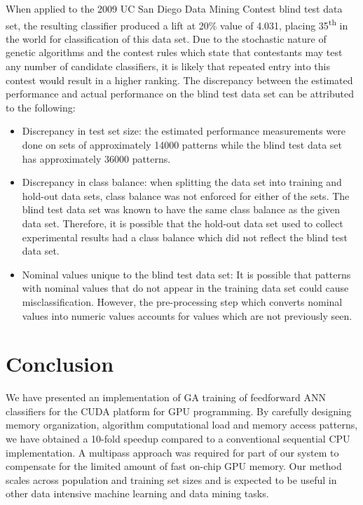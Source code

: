 \documentclass[11pt]{article}       %
\begin{document}
When applied to the 2009 UC San Diego Data Mining Contest blind test data set, the resulting classifier produced a lift at 20\% value of 4.031, placing 35\textsuperscript{th} in the world for classification of this data set. Due to the stochastic nature of genetic algorithms and the contest rules which state that contestants may test any number of candidate classifiers, it is likely that repeated entry into this contest would result in a higher ranking. The discrepancy between the estimated performance and actual performance on the blind test data set can be attributed to the following:
\begin{itemize}
	\item Discrepancy in test set size: the estimated performance measurements were done on sets of approximately 14000 patterns while the blind test data set has approximately 36000 patterns.
	\item Discrepancy in class balance: when splitting the data set into training and hold-out data sets, class balance was not enforced for either of the sets. The blind test data set was known to have the same class balance as the given data set. Therefore, it is possible that the hold-out data set used to collect experimental results had a class balance which did not reflect the blind test data set.
	\item Nominal values unique to the blind test data set: It is possible that patterns with nominal values that do not appear in the training data set could cause misclassification. However, the pre-processing step which converts nominal values into numeric values accounts for values which are not previously seen.
\end{itemize}

\section{Conclusion} \label{concl}
We have presented an implementation of GA training of feedforward ANN classifiers for the CUDA platform for GPU programming. By carefully designing memory organization, algorithm computational load and memory access patterns, we have obtained a 10-fold speedup compared to a conventional sequential CPU implementation. A multipass approach was required for part of our system to compensate for the limited amount of fast on-chip GPU memory. Our method scales across population and training set sizes and is expected to be useful in other data intensive machine learning and data mining tasks.
\end{document}
